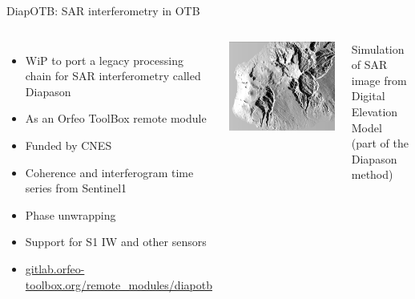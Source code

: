 \begin{frame}{DiapOTB: SAR interferometry in OTB}

  \begin{columns}
  \begin{itemize}
    \item WiP to port a legacy processing chain for SAR interferometry called Diapason
    \item As an Orfeo ToolBox remote module
    \item Funded by CNES  
    \item Coherence and interferogram time series from Sentinel1
    \item Phase unwrapping
    \item Support for S1 IW and other sensors
    \item \url{gitlab.orfeo-toolbox.org/remote_modules/diapotb}
  \end{itemize}
  \includegraphics[width=\textwidth]{images/diapotb.png}\\
  \begin{tiny}
    Simulation of SAR image from Digital Elevation Model (part of the Diapason method)
    \end{tiny}
  \end{columns}
  
\end{frame}
